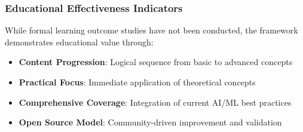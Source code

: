 \subsubsection{Educational Effectiveness Indicators}

While formal learning outcome studies have not been conducted, the framework demonstrates educational value through:

\begin{itemize}
    \item \textbf{Content Progression}: Logical sequence from basic to advanced concepts
    \item \textbf{Practical Focus}: Immediate application of theoretical concepts
    \item \textbf{Comprehensive Coverage}: Integration of current AI/ML best practices
    \item \textbf{Open Source Model}: Community-driven improvement and validation
\end{itemize}